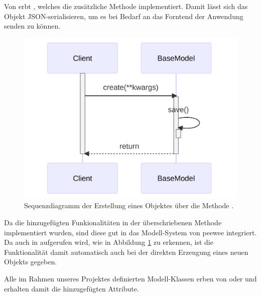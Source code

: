 Von  erbt , welches die zusätzliche Methode  implementiert. Damit lässt sich das Objekt JSON-serialisieren, um es bei Bedarf an das Forntend der Anwendung senden zu können.

\begin{figure}[htbp]
	\centering
	\includegraphics[width=0.75\linewidth]{images/diagrams/database-seq.png}
	\caption{Sequenzdiagramm der Erstellung eines Objektes über die Methode .}
	\label{fig:database-seq}
\end{figure}

Da die hinzugefügten Funkionalitäten in der überschriebenen Methode  implementiert wurden, sind diese gut in das Modell-System von peewee integriert. Da  auch in  aufgerufen wird, wie in Abbildung \ref{fig:database-seq} zu erkennen, ist die Funktionalität damit automatisch auch bei der direkten Erzeugung eines neuen Objekts gegeben.

Alle im Rahmen unseres Projektes definierten Modell-Klassen erben von  oder  und erhalten damit die hinzugefügten Attribute.